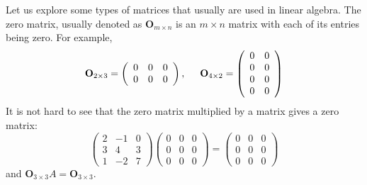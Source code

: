 \documentclass{ximera}
\begin{document}
Let us explore some types of matrices that usually are used in linear
algebra. The zero matrix, usually denoted as $\textbf{O}_{m \times n}$ is
an $m \times n$ matrix with each of its entries being zero. For example,
\[
\textbf{O}_{2\times 3} = \left(\begin{array}{ccc}
0 & 0 &0 \\
0 & 0 & 0
\end{array}\right), \hspace{.5cm} \textbf{O}_{4\times 2} = \left(\begin{array}{cc}
0 & 0 \\
0 & 0 \\
0 & 0\\
0 & 0
\end{array}\right)\]
It is not hard to see that the zero matrix multiplied by a matrix gives a zero matrix:
\[
\left(\begin{array}{ccc}
2 & -1 & 0 \\
3 & 4 & 3\\
1 & -2 & 7
\end{array}\right) \left(\begin{array}{ccc}
0 &0 &0 \\
0 &0 &0 \\
0 &0 &0
\end{array}\right) = \left(\begin{array}{ccc}
0 &0 &0 \\
0 &0 &0 \\
0 &0 &0
\end{array}\right)
\]
and $\textbf{O}_{3\times 3} A = \textbf{O}_{3 \times 3}$.
\end{document}
